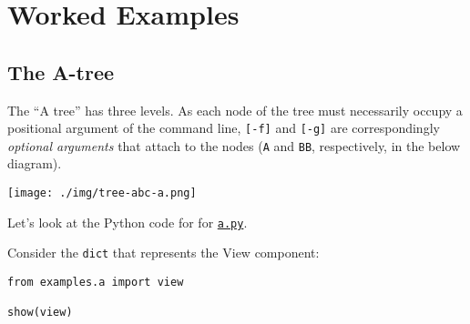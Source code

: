 \documentclass[10pt]{amsart}
\numberwithin{equation}{section}
\begin{document}
\newpage
\section{Worked Examples}
\label{sec:org0aae5ac}
\subsection{The A-tree}
\label{sec:orgc14ab57}
The ``A tree'' has three levels. As each node of the tree must
necessarily occupy a positional argument of the command line,
\texttt{[-f]} and \texttt{[-g]} are correspondingly \emph{optional arguments} that attach to the nodes 
(\texttt{A} and \texttt{BB}, respectively, in the below diagram). 
\begin{center}
\texttt{[image: ./img/tree-abc-a.png]}
\end{center}

Let's look at the Python code for
for \href{https://raw.githubusercontent.com/tharte/parsearg/master/doc/examples/a.py}{\texttt{a.py}}.

Consider the \texttt{dict} that represents the View component:
\begin{verbatim}
from examples.a import view

show(view)
\end{verbatim}
\end{document}
